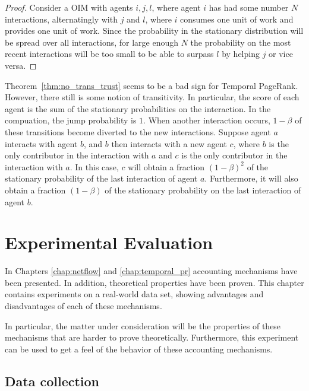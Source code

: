 \documentclass[a4paper,11pt]{book}
\theoremstyle{definition}
\begin{document}
\begin{proof}
    Consider a OIM with agents $i, j, l$, where agent $i$ has had some number $N$ interactions,
    alternatingly with $j$ and $l$, where $i$ consumes one unit of work and provides
    one unit of work. Since the probability in the stationary distribution will
    be spread over all interactions, for large enough $N$ the probability on the most recent
    interactions will be too small to be able to surpass $l$ by helping $j$ or vice versa.
\end{proof}

Theorem~\ref{thm:no_trans_trust} seems to be a bad sign for Temporal PageRank. However, 
there still is some notion of transitivity. In particular, the score of each agent
is the sum of the stationary probabilities on the interaction. In the compuation, 
the jump probability is $1$. When another interaction occurs, $1-\beta$ of these
transitions become diverted to the new interactions. Suppose agent $a$ interacts
with agent $b$, and $b$ then interacts with a new agent $c$, where $b$ is the only
contributor in the interaction with $a$ and $c$ is the only contributor in
the interaction with $a$. In this case, $c$ will obtain a fraction $(1-\beta)^2$ of
the stationary probability of the last interaction of agent $a$. Furthermore, it will
also obtain a fraction $(1-\beta)$ of the stationary probability on the last interaction
of agent $b$.










\chapter{Experimental Evaluation}
\label{chap:exp}

In Chapters \ref{chap:netflow} and \ref{chap:temporal_pr} accounting mechanisms have been presented.
In addition, theoretical properties have been proven. This chapter contains experiments on a real-world
data set, showing advantages and disadvantages of each of these mechanisms.

In particular, the matter under consideration will be the properties of these mechanisms that are
harder to prove theoretically. Furthermore, this experiment can be used to get a feel of the behavior
of these accounting mechanisms.

\section{Data collection}
\end{document}
